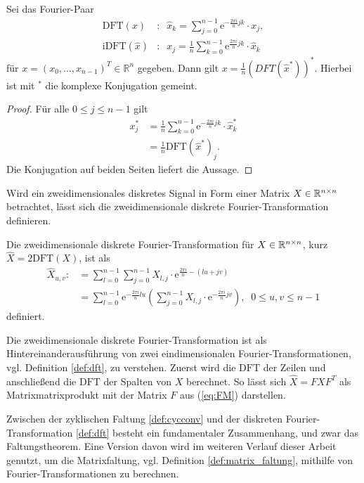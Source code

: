 \begin{lem}
    \label{lem:inversedftasdft}
    Sei das Fourier-Paar
    \begin{align*}
        \mathrm{DFT}(x)&: \; \;\hat{x}_k=\sum_{j=0}^{n-1} \mathrm{e}^{- \frac{2 \pi i}{n} j k} \cdot x_j, \\ 
        \mathrm{iDFT}(\hat{x})&:\; \; x_j= \frac{1}{n} \sum_{k=0}^{n-1} \mathrm{e}^{\frac{2 \pi i}{n} j k} \cdot \hat{x}_k
    \end{align*}
    für $x=(x_0, \ldots, x_{n-1})^T \in \mathbb{R}^n$ gegeben. Dann gilt $x=\frac{1}{n} (DFT(\hat{x}^*))^*$. Hierbei ist mit ${}^*$ die komplexe Konjugation gemeint.
\end{lem}
\begin{proof}
  Für alle $0 \leq j \leq n-1$  gilt
  \begin{align*}
    x_j^{*}&=\frac{1}{n} \sum_{k=0}^{n-1} \mathrm{e}^{-\frac{2 \pi i}{n} j k} \cdot \hat{x}^*_k \\
    &=\frac{1}{n} \mathrm{DFT}(\hat{x}^*)_j.
  \end{align*}
  Die Konjugation auf beiden Seiten liefert die Aussage.
\end{proof}
Wird ein zweidimensionales diskretes Signal in Form einer Matrix $X \in \mathbb{R}^{n \times n}$ betrachtet, lässt sich die zweidimensionale diskrete Fourier-Transformation definieren. 
\begin{defi}
    Die zweidimensionale diskrete Fourier-Transformation für $X \in \mathbb{R}^{n \times n}$, kurz $\hat{X}=2\mathrm{DFT}(X)$, ist als
    \begin{align*}
        \hat{X}_{u,v}:&= \sum_{l=0}^{n-1} \sum_{j=0}^{n-1} X_{l,j} \cdot \mathrm{e}^{\frac{2 \pi i}{n} -(lu+jv)} \\
        &=\sum_{l=0}^{n-1} \mathrm{e}^{-\frac{2 \pi i}{n} l u} \left(\sum_{j=0}^{n-1} X_{l,j} \cdot \mathrm{e}^{-\frac{2 \pi i}{n} j v}\right), \; \; 0 \leq u, v \leq n-1
    \end{align*}
    definiert.
\end{defi}
Die zweidimensionale diskrete Fourier-Transformation ist als Hintereinanderausführung von zwei eindimensionalen Fourier-Transformationen, vgl. Definition \ref{def:dft}, zu verstehen. Zuerst wird die $\mathrm{DFT}$ der Zeilen und anschließend die $\mathrm{DFT}$ der Spalten von $X$ berechnet. So lässt sich $\hat{X}=FXF^T$ als Matrixmatrixprodukt mit der Matrix $F$ aus (\ref{eq:FM}) darstellen.

Zwischen der zyklischen Faltung \ref{def:cycconv} und der diskreten Fourier-Transformation \ref{def:dft} besteht ein fundamentaler Zusammenhang, und zwar das Faltungstheorem. Eine Version davon wird im weiteren Verlauf dieser Arbeit genutzt, um die Matrixfaltung, vgl. Definition \ref{def:matrix_faltung}, mithilfe von Fourier-Transformationen zu berechnen.

